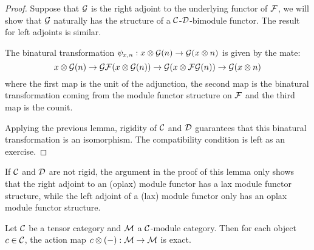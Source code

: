 \documentclass{amsart}
\begin{document}
\begin{proof}
Suppose that $\mathcal G$ is the right adjoint to the underlying functor of $\mathcal F$, we will show that $\mathcal G$ naturally has the structure of a $\mathcal C$-$\mathcal D$-bimodule functor.  The result for left adjoints is similar.

The binatural transformation $\psi_{x,n}: x \otimes \mathcal G(n) \rightarrow \mathcal G(x \otimes n)$ is given by the mate:
$$x \otimes \mathcal G(n) \rightarrow \mathcal G \mathcal F(x \otimes \mathcal G(n)) \rightarrow \mathcal G(x \otimes \mathcal F\mathcal G(n)) \rightarrow \mathcal G(x \otimes n)$$
where the first map is the unit of the adjunction, the second map is the binatural transformation coming from the module functor structure on $\mathcal F$ and the third map is the counit.  
\begin{center}
\end{center}

Applying the previous lemma, rigidity of $\mathcal C$ and $\mathcal D$ guarantees that this binatural transformation is an isomorphism.  The compatibility condition is left as an exercise.
\end{proof}

\begin{remark}
If $\mathcal C$ and $\mathcal D$ are not rigid, the argument in the proof of this lemma only shows that the right adjoint to an (oplax) module functor has a lax module functor structure, while the left adjoint of a (lax) module functor only has an oplax module functor structure.  %
\end{remark}

\begin{lemma}\label{lem:partially_exact_action} \cite[Prop. 1.13.1]{EGNO} \cite[Prop. 2.1.8]{MR1797619}
	Let $\mathcal C$ be a tensor category and $\mathcal M$ a $\mathcal C$-module category. Then for each object $c \in \mathcal C$, the action map $c \otimes (-): \mathcal M \to \mathcal M$ is exact. 
\end{lemma}
\end{document}
